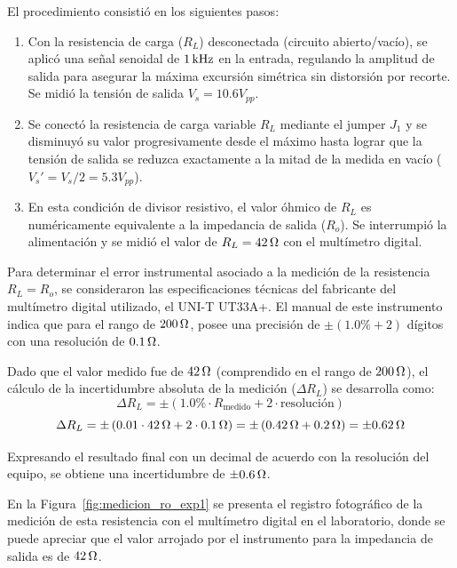El procedimiento consistió en los siguientes pasos:
\begin{enumerate}
    \item Con la resistencia de carga ($R_L$) desconectada (circuito abierto/vacío), se aplicó una señal
          senoidal de $1\kHz$ en la entrada, regulando la amplitud de salida para asegurar la máxima excursión
          simétrica sin distorsión por recorte. Se midió la tensión de salida
          $V_s = 10.6V_{pp}$.
    \item Se conectó la resistencia de carga variable $R_L$ mediante el jumper $J_1$ y se disminuyó su valor progresivamente
          desde el máximo hasta lograr que la tensión de salida se reduzca exactamente a la mitad de la
          medida en vacío ($V_s' = V_s / 2 = 5.3V_{pp}$).
    \item En esta condición de divisor resistivo, el valor óhmico de $R_L$ es numéricamente equivalente
          a la impedancia de salida ($R_o$). Se interrumpió la alimentación y se
          midió el valor de $R_L = 42\ohm$
          con el multímetro digital.
\end{enumerate}

Para determinar el error instrumental asociado a la
medición de la resistencia $R_L = R_o$, se consideraron las especificaciones
técnicas del fabricante del multímetro digital utilizado, el UNI-T UT33A+. El
manual de este instrumento indica que para el rango de $200\ohm$, posee una
precisión de $\pm(1.0\% + 2)$ dígitos con una resolución de $0.1\ohm$.

Dado que el valor medido fue de $42\ohm$ (comprendido en el rango de $200\ohm$), el cálculo de la incertidumbre absoluta de la medición ($\Delta R_L$) se desarrolla como:
\begin{equation}
    \Delta R_L = \pm \left( 1.0\% \cdot R_{\text{medido}} + 2 \cdot \text{resolución} \right)
\end{equation}
\begin{equation}
    \Delta R_L = \pm \left( 0.01 \cdot 42\ohm + 2 \cdot 0.1\ohm \right) = \pm \left( 0.42\ohm + 0.2\ohm \right) = \pm 0.62\ohm
\end{equation}

Expresando el resultado final con un decimal de acuerdo con la resolución del equipo, se obtiene una incertidumbre de $\pm 0.6\ohm$.

En la Figura~\ref{fig:medicion_ro_exp1} se presenta el registro fotográfico de la medición de esta resistencia con el multímetro digital en el laboratorio, donde se puede apreciar que el valor arrojado por el instrumento para la impedancia de salida es de $42\ohm$.

